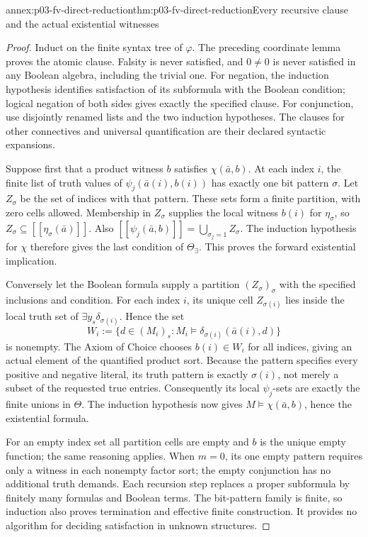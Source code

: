 \begin{annexitem}{annex:p03-fv-direct-reduction}{thm:p03-fv-direct-reduction}{Every recursive clause and the actual existential witnesses}
\begin{proof}
Induct on the finite syntax tree of \(\varphi\). The preceding coordinate
lemma proves the atomic clause. Falsity is never satisfied, and \(0\ne0\)
is never satisfied in any Boolean algebra, including the trivial one.
For negation, the induction hypothesis identifies satisfaction of its
subformula with the Boolean condition; logical negation of both sides gives
exactly the specified clause. For conjunction, use disjointly renamed lists
and the two induction hypotheses. The clauses for other connectives and
universal quantification are their declared syntactic expansions.

Suppose first that a product witness \(b\) satisfies \(\chi(\bar a,b)\).
At each index \(i\), the finite list of truth values of
\(\psi_j(\bar a(i),b(i))\) has exactly one bit pattern \(\sigma\).
Let \(Z_\sigma\) be the set of indices with that pattern. These sets form
a finite partition, with zero cells allowed. Membership in \(Z_\sigma\)
supplies the local witness \(b(i)\) for \(\eta_\sigma\), so
\(Z_\sigma\subseteq[\![\eta_\sigma(\bar a)]\!]\).
Also \([\![\psi_j(\bar a,b)]\!]=
\bigcup_{\sigma_j=1}Z_\sigma\). The induction hypothesis for \(\chi\)
therefore gives the last condition of \(\Theta_\exists\). This proves
the forward existential implication.

Conversely let the Boolean formula supply a partition \((Z_\sigma)_\sigma\)
with the specified inclusions and condition. For each index \(i\), its unique
cell \(Z_{\sigma(i)}\) lies inside the local truth set of
\(\exists y_s\delta_{\sigma(i)}\). Hence the set
\[
 W_i:=\{d\in(M_i)_s:
       M_i\models\delta_{\sigma(i)}(\bar a(i),d)\}
\]
is nonempty. The Axiom of Choice chooses \(b(i)\in W_i\) for all indices,
giving an actual element of the quantified product sort. Because the pattern
specifies every positive and negative literal, its truth pattern is exactly
\(\sigma(i)\), not merely a subset of the requested true entries.
Consequently its local \(\psi_j\)-sets are exactly the finite unions in
\(\Theta\). The induction hypothesis now gives
\(M\models\chi(\bar a,b)\), hence the existential formula.

For an empty index set all partition cells are empty and \(b\) is the
unique empty function; the same reasoning applies. When \(m=0\), its one
empty pattern requires only a witness in each nonempty factor sort; the
empty conjunction has no additional truth demands. Each recursion step
replaces a proper subformula by finitely many formulas and Boolean terms.
The bit-pattern family is finite, so induction also proves termination and
effective finite construction. It provides no algorithm for deciding
satisfaction in unknown structures.
\end{proof}
\end{annexitem}
